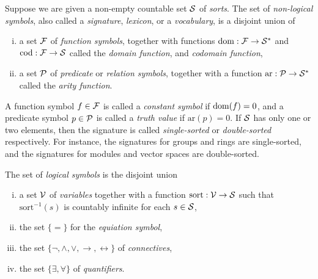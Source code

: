 \documentclass{../../large}
\begin{document}
\begin{prb}
Suppose we are given a non-empty countable set $\mathcal{S}$ of \emph{sorts}.
The set of \emph{non-logical symbols}, also called a \emph{signature}, \emph{lexicon}, or a \emph{vocabulary}, is a disjoint union of
\begin{enumerate}[(i)]
\item a set $\mathcal{F}$ of \emph{function symbols}, together with functions $\mathrm{dom}:\mathcal{F}\to\mathcal{S}^*$ and $\mathrm{cod}:\mathcal{F}\to\mathcal{S}$ called the \emph{domain function}, and \emph{codomain function},
\item a set $\mathcal{P}$ of \emph{predicate} or \emph{relation symbols}, together with a function $\mathrm{ar}:\mathcal{P}\to\mathcal{S}^*$ called the \emph{arity function}.
\end{enumerate}
A function symbol $f\in\mathcal{F}$ is called a \emph{constant symbol} if $\operatorname{dom}(f)=0$, and a predicate symbol $p\in\mathcal{P}$ is called a \emph{truth value} if $\mathrm{ar}(p)=0$.
If $\mathcal{S}$ has only one or two elements, then the signature is called \emph{single-sorted} or \emph{double-sorted} respectively.
For instance, the signatures for groups and rings are single-sorted, and the signatures for modules and vector spaces are double-sorted.

The set of \emph{logical symbols} is the disjoint union
\begin{enumerate}[(i)]
\item a set $\mathcal{V}$ of \emph{variables} together with a function $\mathrm{sort}:\mathcal{V}\to\mathcal{S}$ such that $\mathrm{sort}^{-1}(s)$ is countably infinite for each $s\in\mathcal{S}$,
\item the set $\{=\}$ for the \emph{equiation symbol},
\item the set $\{\neg,\wedge,\vee,\to,\leftrightarrow\}$ of \emph{connectives},
\item the set $\{\exists,\forall\}$ of \emph{quantifiers}.
\end{enumerate}


\end{prb}
\end{document}
